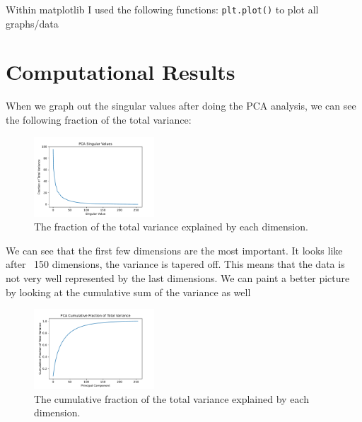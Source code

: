 \documentclass[11pt]{amsart}
\begin{document}
Within matplotlib I used the following functions:
\subitem \texttt{plt.plot()} to plot all graphs/data




\section{Computational Results}\label{sec:results}
When we graph out the singular values after doing the PCA analysis, we can see the following fraction of
the total variance:

\begin{figure}[htp]
    \centering
    \includegraphics[width=0.4\textwidth]{./PCA Singular Values.pdf}
    \caption{The fraction of the total variance explained by each dimension.}
    \label{fig:singular-values}
\end{figure}

We can see that the first few dimensions are the most important. It looks like after ~150 dimensions, 
the variance is tapered off. This means that the data is not very well represented by the last dimensions. We can 
paint a better picture by looking at the cumulative sum of the variance as well

\begin{figure}[htp]
    \centering
    \includegraphics[width=0.4\textwidth]{./PCA Cumulative Fraction of Total Variance.pdf}
    \caption{The cumulative fraction of the total variance explained by each dimension.}
    \label{fig:cumulative-singular-values}
\end{figure}
\end{document}
